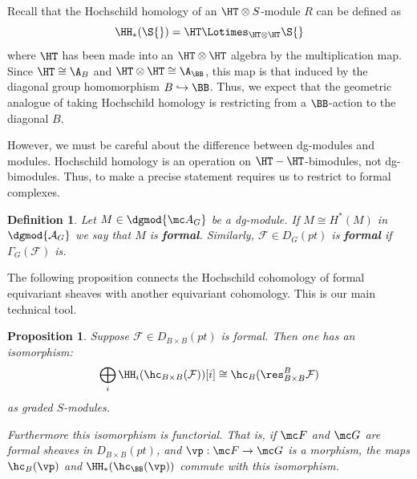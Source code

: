 \documentclass[12pt]{wart}
\newtheorem{defi}{Definition}
\newtheorem{prop}[thm]{Proposition}
\theoremstyle{remark}
\begin{document}
Recall that the Hochschild homology of an $\HT\otimes S$-module $R$ can be defined as
\begin{equation*}
  \HH_*(\S{})=\HT \Lotimes_{\HT\otimes \HT} \S{}
\end{equation*}
where $\HT$ has been made into an $\HT\otimes\HT$ algebra by the
multiplication map.  Since $\HT\cong\A_{B}$ and
$\HT\otimes\HT\cong\A_{\BB}$, this map is that induced by the diagonal
group homomorphism $B\hookrightarrow\BB$.  Thus, we expect that the
geometric analogue of taking Hochschild homology is restricting from a
$\BB$-action to the diagonal $B$.

However, we must be careful about the difference between dg-modules
and modules.  Hochschild homology is an operation on
$\HT-\HT$-bimodules, not dg-bimodules.  Thus, to make a precise
statement requires us to restrict to formal complexes.


\begin{defi} 
  Let $M \in \dgmod {\mc A_G}$ be a dg-module. If $M \cong H^*(M)$
  in $\dgmod{\mathcal{A}_G}$ we say that $M$ is {\bf formal}. Similarly,
  $\mathcal{F} \in D_G(pt)$ is {\bf formal} if $\Gamma_G(\mathcal{F})$
  is. 
\end{defi}

The following proposition connects the Hochschild cohomology of formal
equivariant sheaves with another equivariant cohomology. This is our
main technical tool.

\begin{prop} \label{formal-isom}
  Suppose $\mathcal{F} \in D_{B \times B}(pt)$ is formal. Then one has
  an isomorphism:
\begin{equation*}
\bigoplus_{i} \HH_i( \hc_{B \times B}(\mathcal{F}))[i] \cong \hc_B( \res_{B \times B}^B \mathcal{F})
\end{equation*}
as graded $S$-modules. 

Furthermore this isomorphism is functorial.  That is, if $\mc F$ and
$\mc G$ are formal sheaves in $ D_{B \times B}(pt)$, and $\vp:\mc
F\to\mc G$ is a morphism, the maps $\hc_{B}(\vp)$ and $\HH_*(\hc_{\BB}(\vp))$ commute with this isomorphism.
\end{prop}
\end{document}
